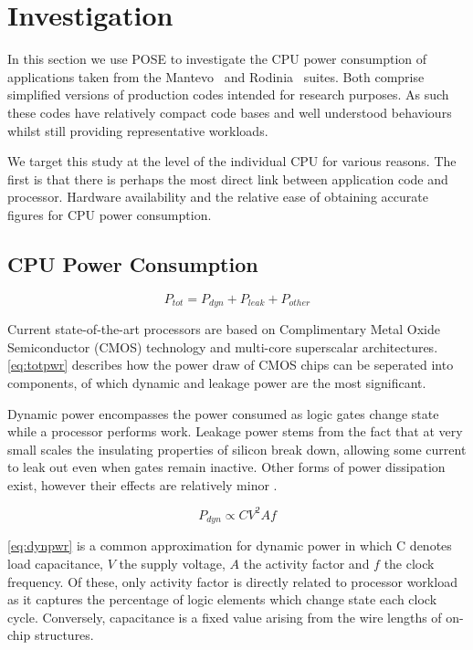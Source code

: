 \section{Investigation}
\label{sec:investigation}
In this section we use POSE to investigate the CPU power consumption of applications taken from the Mantevo~\cite{heroux:2009aa} and Rodinia~\cite{che:2009aa} suites.
Both comprise simplified versions of production codes intended for research purposes.
As such these codes have relatively compact code bases and well understood behaviours whilst still providing representative workloads.

We target this study at the level of the individual CPU for various reasons.
The first is that there is perhaps the most direct link between application code and processor. 
Hardware availability and the relative ease of obtaining accurate figures for CPU power consumption. 

\subsection{CPU Power Consumption}
\begin{equation}
\label{eq:totpwr}
P_{tot} = P_{dyn} + P_{leak} + P_{other}
\end{equation}

Current state-of-the-art processors are based on Complimentary Metal Oxide Semiconductor (CMOS) technology and multi-core superscalar architectures.
\autoref{eq:totpwr} describes how the power draw of CMOS chips can be seperated into components, of which dynamic and leakage power are the most significant.

Dynamic power encompasses the power consumed as logic gates change state while a processor performs work. 
Leakage power stems from the fact that at very small scales the insulating properties of silicon break down, allowing some current to leak out even when gates remain inactive.
Other forms of power dissipation exist, however their effects are relatively minor \cite{kaxiras:2008aa}.

\begin{equation} 
\label{eq:dynpwr}
P_{dyn} \propto CV^{2}Af
\end{equation}

\autoref{eq:dynpwr} is a common approximation for dynamic power in which C denotes load capacitance, $V$ the supply voltage, $A$ the activity factor and $f$ the clock frequency.
Of these, only activity factor is directly related to processor workload as it captures the percentage of logic elements which change state each clock cycle.
Conversely, capacitance is a fixed value arising from the wire lengths of on-chip structures.


